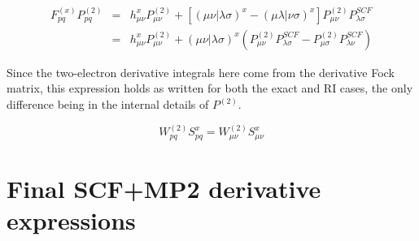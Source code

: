 \documentclass[fleqn,12pt]{article}
\newcommand{\Ptwo}{P^{(2)}}
\newcommand{\Wtwo}{W^{(2)}}
\newcommand{\Fx}{F^{(x)}}
\begin{document}
\begin{eqnarray}
  \Fx_{pq} \Ptwo_{pq} & = & h^x_{\mu\nu}\Ptwo_{\mu\nu}  +
    \left[(\mu\nu|\lambda\sigma)^x - (\mu\lambda|\nu\sigma)^x\right]
    \Ptwo_{\mu\nu} P^{SCF}_{\lambda\sigma} \\
  & = & h^x_{\mu\nu}\Ptwo_{\mu\nu}  + (\mu\nu|\lambda\sigma)^x \left( 
    \Ptwo_{\mu\nu} P^{SCF}_{\lambda\sigma} - 
    \Ptwo_{\mu\sigma} P^{SCF}_{\lambda\nu} \right)
\end{eqnarray}
\begin{changebar}
Since the two-electron derivative integrals here come from the
derivative Fock matrix, this expression holds as written for both the
exact and RI cases, the only difference being in the internal details
of $\Ptwo$.
\end{changebar}

\begin{equation}
\Wtwo_{pq} S^{x}_{pq} = \Wtwo_{\mu\nu} S^{x}_{\mu\nu}
\end{equation}

\section{Final SCF+MP2 derivative expressions}
\end{document}
